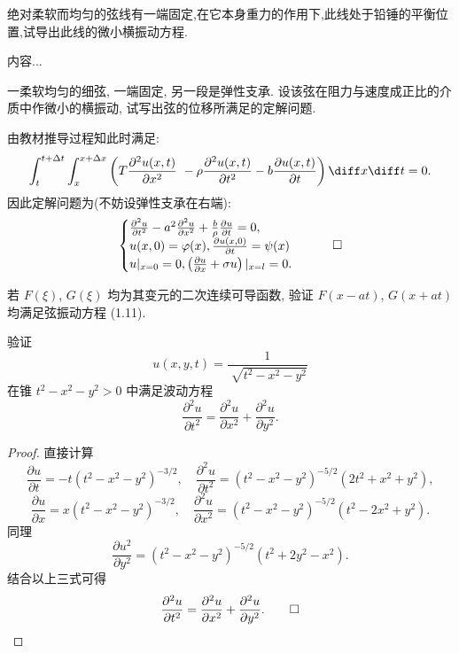 

\begin{exercise}
  绝对柔软而均匀的弦线有一端固定,在它本身重力的作用下,此线处于铅锤的平衡位置,试导出此线的微小横振动方程.
\end{exercise}

\begin{solve}
	内容...
\end{solve}


\begin{exercise}
  一柔软均匀的细弦, 一端固定, 另一段是弹性支承.
  设该弦在阻力与速度成正比的介质中作微小的横振动, 试写出弦的位移所满足的定解问题.
\end{exercise}

\begin{solve}
  由教材推导过程知此时满足:
  \[\int_t^{t+\Delta t}\int_x^{x+\Delta x}\left(T\frac{\partial^2u(x,t)}{\partial x^2}\
    - \rho\frac{\partial^2u(x,t)}{\partial t^2}
    - b\frac{\partial u(x,t)}{\partial t}\right)\diff x\diff t = 0.\]
  因此定解问题为(不妨设弹性支承在右端):
  \[\begin{cases}
    \frac{\partial^2u}{\partial t^2}
    - a^2\frac{\partial^2u}{\partial x^2}
    + \frac{b}{\rho}\frac{\partial u}{\partial t}
    = 0, \\
    u(x,0)
    = \varphi(x),\frac{\partial u(x,0)}{\partial t}
    = \psi(x)\\u|_{x=0}=0,\left(\frac{\partial u}{\partial x}
    + \sigma u\right)|_{x=l}=0.
  \end{cases}\qedhere\]
\end{solve}


\begin{exercise}
  若 $F(\xi)$, $G(\xi)$ 均为其变元的二次连续可导函数,
  验证 $F(x-at)$, $G(x+at)$ 均满足弦振动方程 (1.11).
\end{exercise}



\begin{exercise}
  验证
  \[u(x,y,t) = \frac{1}{\sqrt[]{t^2-x^2-y^2}}\]
  在锥 $t^2-x^2-y^2>0$ 中满足波动方程
  \[\frac{\partial^2 u}{\partial t^2}
    = \frac{\partial^2 u}{\partial x^2}
      + \frac{\partial^2 u}{\partial y^2}.\]
\end{exercise}

\begin{proof}
  直接计算
  \[\frac{\partial u}{\partial t}=-t(t^2-x^2-y^2)^{-3/2},\quad
    \frac{\partial^2u}{\partial t^2}=(t^2-x^2-y^2)^{-5/2}(2t^2+x^2+y^2),\]
  \[\frac{\partial u}{\partial x}=x(t^2-x^2-y^2)^{-3/2},\quad
    \frac{\partial^2u}{\partial x^2}=(t^2-x^2-y^2)^{-5/2}(t^2-2x^2+y^2).\]
  同理
  \[\frac{\partial u^2}{\partial y^2}=(t^2-x^2-y^2)^{-5/2}(t^2+2y^2-x^2).\]
  结合以上三式可得
  \[\frac{\partial^2u}{\partial t^2}
    = \frac{\partial^2u}{\partial x^2}+\frac{\partial^2u}{\partial y^2}.\qedhere\]
\end{proof}


